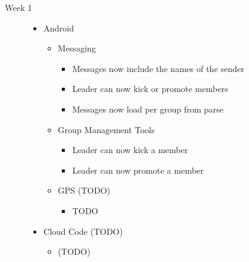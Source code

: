 \documentclass[11pt]{article}
\begin{document}
\begin{description}
	\item[Week 1] \hfill
	\begin{itemize}
		\item Android
		\begin{itemize}
			\item Messaging
			\begin{itemize}
				\item Messages now include the names of the sender
				\item Leader can now kick or promote members
				\item Messages now load per group from parse
			\end{itemize}
			\item Group Management Tools
			\begin{itemize}
				\item Leader can now kick a member
				\item Leader can now promote a member
			\end{itemize}
			\item GPS (TODO)
			\begin{itemize}
				\item TODO
			\end{itemize}
		\end{itemize}
		\item Cloud Code (TODO)
		\begin{itemize}
			\item (TODO)
		\end{itemize}
	\end{itemize}
	

\end{description}
\end{document}
